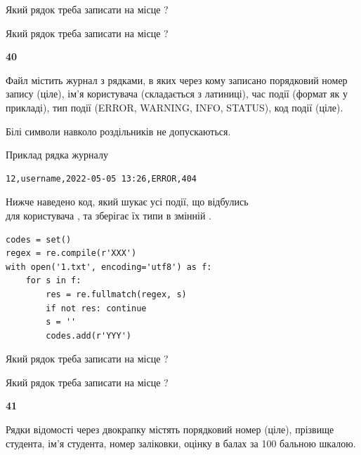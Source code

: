 Який рядок треба записати на місце  ?\par
\vspace{5mm}


Який рядок треба записати на місце  ?\par


\newpage

{\begin {center}\textbf{ 40}\end {center}}\par
Файл  містить журнал з рядками, в яких через кому записано поряд\-ко\-вий номер запису (ціле), ім'я користувача (складається з латиниці), час події (фор\-мат як у прикладі), тип події (ERROR, WARNING, INFO, STATUS), код події (ціле).

Білі символи навколо роздільників не допускаються.

Приклад рядка журналу



\begin{verbatim}
12,username,2022-05-05 13:26,ERROR,404
\end{verbatim}


Нижче наведено код, який шукає усі події, що відбулись\\ для користувача , та зберігає їх типи в змінній .



\begin{verbatim}
codes = set()
regex = re.compile(r'XXX')
with open('1.txt', encoding='utf8') as f:
    for s in f:
        res = re.fullmatch(regex, s)
        if not res: continue
        s = ''
        codes.add(r'YYY')
\end{verbatim}





Який рядок треба записати на місце  ?\par
\vspace{5mm}


Який рядок треба записати на місце  ?\par


\newpage

{\begin {center}\textbf{ 41}\end {center}}\par
Рядки відомості через двокрапку містять порядковий номер (ціле), пріз\-ви\-ще студен\-та, ім'я студента, номер заліковки, оцінку в балах за 100 бальною шкалою.

